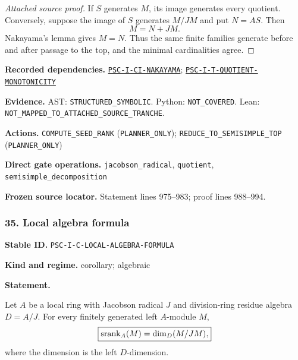 \documentclass[a4paper,11pt]{article}
\newcommand{\field}[2]{\noindent\textbf{#1.} #2\par}
\begin{document}
\begin{proof}[Attached source proof]
If $S$ generates $M$, its image generates every quotient.  Conversely, suppose the image of $S$ generates $M/JM$ and put $N=AS$.  Then
\[
M=N+JM.
\]
Nakayama's lemma gives $M=N$.  Thus the same finite families generate before and after passage to the top, and the minimal cardinalities agree.
\end{proof}
\field{Recorded dependencies}{\hyperref[rec:PSC-I-CI-NAKAYAMA]{\nolinkurl{PSC-I-CI-NAKAYAMA}}; \hyperref[rec:PSC-I-T-QUOTIENT-MONOTONICITY]{\nolinkurl{PSC-I-T-QUOTIENT-MONOTONICITY}}}
\field{Evidence}{AST: \nolinkurl{STRUCTURED_SYMBOLIC}. Python: \nolinkurl{NOT_COVERED}. Lean: \nolinkurl{NOT_MAPPED_TO_ATTACHED_SOURCE_TRANCHE}.}
\field{Actions}{\nolinkurl{COMPUTE_SEED_RANK} (\nolinkurl{PLANNER_ONLY}); \nolinkurl{REDUCE_TO_SEMISIMPLE_TOP} (\nolinkurl{PLANNER_ONLY})}
\field{Direct gate operations}{\nolinkurl{jacobson_radical}, \nolinkurl{quotient}, \nolinkurl{semisimple_decomposition}}
\field{Frozen source locator}{Statement lines 975--983; proof lines 988--994.}
\subsubsection*{35. Local algebra formula}
\label{rec:PSC-I-C-LOCAL-ALGEBRA-FORMULA}
\field{Stable ID}{\nolinkurl{PSC-I-C-LOCAL-ALGEBRA-FORMULA}}
\field{Kind and regime}{corollary; algebraic}
\textbf{Statement.}\par
Let $A$ be a local ring with Jacobson radical $J$ and division-ring residue algebra $D=A/J$.  For every finitely generated left $A$-module $M$,
\[
\boxed{
\operatorname{srank}_A(M)=\dim_D(M/JM),
}
\]
where the dimension is the left $D$-dimension.
\end{document}
